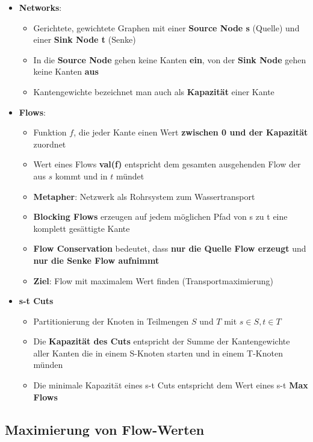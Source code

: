 \documentclass[10pt,a4paper]{article}
\begin{document}
	\begin{itemize}
		\item \textbf{Networks}:
		\begin{itemize}
			\item Gerichtete, gewichtete Graphen mit einer \textbf{Source Node s} (Quelle) und einer \textbf{Sink Node t} (Senke)
			\item In die \textbf{Source Node} gehen keine Kanten \textbf{ein}, von der \textbf{Sink Node} gehen keine Kanten \textbf{aus}
			\item Kantengewichte bezeichnet man auch als \textbf{Kapazität} einer Kante
		\end{itemize}
		\item \textbf{Flows}:
		\begin{itemize}
			\item Funktion $f$, die jeder Kante einen Wert \textbf{zwischen 0 und der Kapazität} zuordnet
			\item Wert eines Flows \textbf{val(f)} entspricht dem gesamten ausgehenden Flow der aus $s$ kommt und in $t$ mündet
			\item \textbf{Metapher}: Netzwerk als Rohrsystem zum Wassertransport
			\item \textbf{Blocking Flows} erzeugen auf jedem möglichen Pfad von s zu t eine komplett gesättigte Kante
			\item \textbf{Flow Conservation} bedeutet, dass \textbf{nur die Quelle Flow erzeugt} und \textbf{nur die Senke Flow aufnimmt}
			\item \textbf{Ziel}: Flow mit maximalem Wert finden (Transportmaximierung)
		\end{itemize}
		\item \textbf{s-t Cuts}
		\begin{itemize}
			\item Partitionierung der Knoten in Teilmengen $S$ und $T$ mit $s \in S, t \in T$
			\item Die \textbf{Kapazität des Cuts} entspricht der Summe der Kantengewichte aller Kanten die in einem S-Knoten starten und in einem T-Knoten münden
			\item Die minimale Kapazität eines s-t Cuts entspricht dem Wert eines s-t \textbf{Max Flows}
		\end{itemize}
	\end{itemize}

	\subsection{Maximierung von Flow-Werten}
	\label{mfm:sub:maximierung_von_flow_werten}
	
\end{document}
